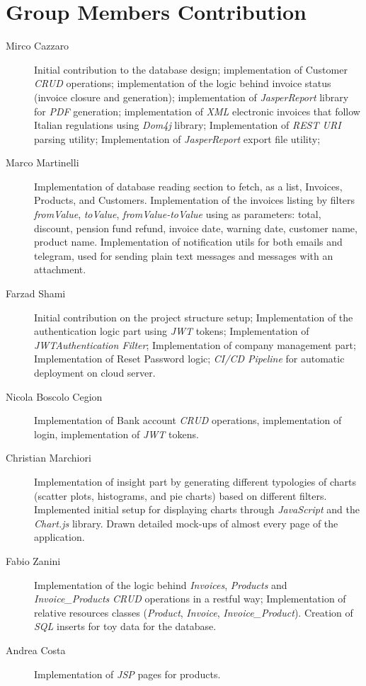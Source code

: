 \newpage
\section{Group Members Contribution}


\begin{description}
	\item[Mirco Cazzaro] Initial contribution to the database design; implementation of Customer \textit{CRUD} operations; implementation of the logic behind invoice status (invoice closure and generation); implementation of \textit{JasperReport} library for \textit{PDF} generation; implementation of \textit{XML} electronic invoices that follow Italian regulations using \textit{Dom4j} library; Implementation of \textit{REST URI} parsing utility; Implementation of \textit{JasperReport} export file utility;
	\item[Marco Martinelli] Implementation of database reading section to fetch, as a list, Invoices, Products, and Customers. 
    Implementation of the invoices listing by filters \textit{fromValue}, \textit{toValue}, \textit{fromValue-toValue} using as parameters: total, discount, pension fund refund, invoice date, warning date, customer name, product name.
    Implementation of notification utils for both emails and telegram, used for sending plain text messages and messages with an attachment.  
	\item[Farzad Shami] Initial contribution on the project structure setup; Implementation of the authentication logic part using \textit{JWT} tokens; Implementation of \textit{JWTAuthentication Filter}; Implementation of company management part; Implementation of Reset Password logic; \textit{CI/CD Pipeline} for automatic deployment on cloud server.
	\item[Nicola Boscolo Cegion] Implementation of Bank account \textit{CRUD} operations, implementation of login, implementation of \textit{JWT} tokens.
	\item[Christian Marchiori] Implementation of insight part by generating different typologies of charts (scatter plots, histograms, and pie charts) based on different filters. Implemented initial setup for displaying charts through \textit{JavaScript} and the \textit{Chart.js} library. Drawn detailed mock-ups of almost every page of the application.
	\item[Fabio Zanini] Implementation of the logic behind \textit{Invoices}, \textit{Products} and \textit{Invoice\_Products} \textit{CRUD} operations in a restful way; Implementation of relative resources classes (\textit{Product}, \textit{Invoice}, \textit{Invoice\_Product}). Creation of \textit{SQL} inserts for toy data for the database.
	\item[Andrea Costa] Implementation of \textit{JSP} pages for products.
\end{description}
